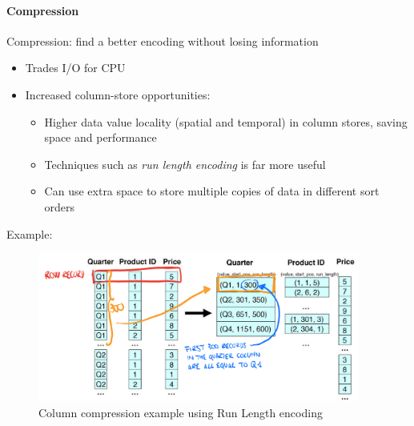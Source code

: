 \documentclass[10pt,a4paper]{article}
\begin{document}
\paragraph{Compression}
Compression: find a better encoding without losing information
\begin{itemize}
	\item Trades I/O for CPU
	\item Increased column-store opportunities:
	\begin{itemize}
		\item Higher data value locality (spatial and temporal) in column stores, saving space and performance
		\item Techniques such as \textit{run length encoding} is far more useful
		\item Can use extra space to store multiple copies of data in different sort orders
	\end{itemize}
\end{itemize}
Example:
\begin{figure}[h!]
 \hfill \includegraphics[width=300pt]{images/column-compression-ex.png}\hspace*{\fill}
 \caption{Column compression example using Run Length encoding}
\end{figure} 
\pagebreak
\end{document}
